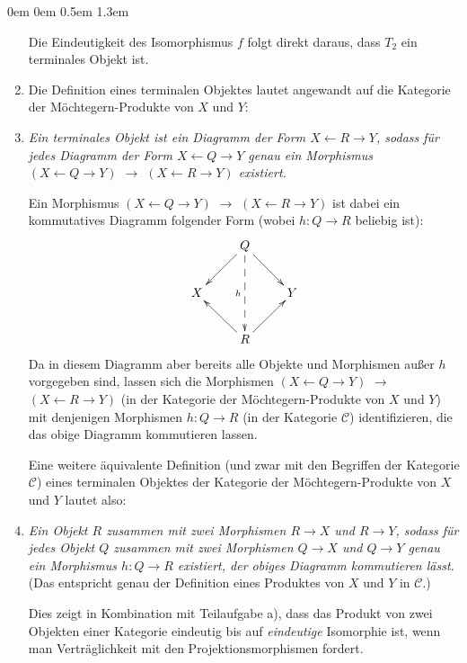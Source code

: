\documentclass[a4paper,ngerman]{scrartcl}
\theoremstyle{definition}
\theoremstyle{plain}
\theoremstyle{remark}
\newcommand{\C}{\mathcal{C}}
\newenvironment{indentblock}{%
  \list{}{\leftmargin\leftmargin}%
  \item\relax
}{%
  \endlist
}
\begin{document}
\begin{list}{}{0em \leftmargin0em \itemindent0.5em \itemsep 1.3em}
\begin{enumerate}
Die Eindeutigkeit des Isomorphismus $f$ folgt direkt daraus, dass $T_2$ ein terminales Objekt ist.

\item
Die Definition eines terminalen Objektes lautet angewandt auf die Kategorie der Möchtegern-Produkte von $X$ und $Y$:
\begin{indentblock}\emph{%
  Ein terminales Objekt ist ein Diagramm der Form \mbox{$X\leftarrow R\to Y$}, sodass für jedes Diagramm der Form \mbox{$X\leftarrow Q\to Y$} genau ein Morphismus \mbox{$(X\leftarrow Q\to Y)$} $\to$ \mbox{$(X\leftarrow R\to Y)$} existiert.
}\end{indentblock}

Ein Morphismus \mbox{$(X\leftarrow Q\to Y)$} $\to$ \mbox{$(X\leftarrow R\to Y)$} ist dabei ein kommutatives Diagramm folgender Form (wobei $h:Q\to R$ beliebig ist):
\[ \xymatrix{
 & Q \ar[ld]\ar[rd]\ar@{-->}[dd]_h & \\
X & & Y \\
 & R \ar[lu]\ar[ru] &
} \]
Da in diesem Diagramm aber bereits alle Objekte und Morphismen außer $h$ vorgegeben sind, lassen sich die Morphismen \mbox{$(X\leftarrow Q\to Y)$} $\to$ \mbox{$(X\leftarrow R\to Y)$} (in der Kategorie der Möchtegern-Produkte von $X$ und $Y$) mit denjenigen Morphismen $h:Q\to R$ (in der Kategorie $\C$) identifizieren, die das obige Diagramm kommutieren lassen.

Eine weitere äquivalente Definition (und zwar mit den Begriffen der Kategorie $\C$) eines terminalen Objektes der Kategorie der Möchtegern-Produkte von $X$ und $Y$ lautet also:
\begin{indentblock}\emph{%
  Ein Objekt $R$ zusammen mit zwei Morphismen $R\to X$ und $R\to Y$, sodass für jedes Objekt $Q$ zusammen mit zwei Morphismen $Q\to X$ und $Q\to Y$ genau ein Morphismus $h:Q\to R$ existiert, der obiges Diagramm kommutieren lässt.
}\end{indentblock}
(Das entspricht genau der Definition eines Produktes von $X$ und $Y$ in $\C$.)

Dies zeigt in Kombination mit Teilaufgabe a), dass das Produkt von zwei Objekten einer Kategorie eindeutig bis auf \emph{eindeutige} Isomorphie ist, wenn man Verträglichkeit mit den Projektionsmorphismen fordert.
\end{enumerate}



\end{list}
\end{document}

